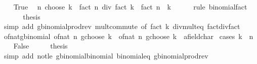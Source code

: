 \begin{isabellebody}
\ \ \isamarkupfalse%
\ True\ \isamarkupfalse%
\ {\isachardoublequoteopen}n\ choose\ k\ {\isacharequal}{\kern0pt}\ fact\ n\ div\ {\isacharparenleft}{\kern0pt}fact\ k\ {\isacharasterisk}{\kern0pt}\ fact\ {\isacharparenleft}{\kern0pt}n\ {\isacharminus}{\kern0pt}\ k{\isacharparenright}{\kern0pt}{\isacharparenright}{\kern0pt}{\isachardoublequoteclose}\isanewline
\ \ \ \ \isamarkupfalse%
\ {\isacharparenleft}{\kern0pt}rule\ binomial{\isacharunderscore}{\kern0pt}fact{\isacharprime}{\kern0pt}{\isacharparenright}{\kern0pt}\isanewline
\ \ \isamarkupfalse%
\ {\isacharasterisk}{\kern0pt}\ \isamarkupfalse%
\ {\isacharquery}{\kern0pt}thesis\isanewline
\ \ \ \ \isamarkupfalse%
\ {\isacharparenleft}{\kern0pt}simp\ add{\isacharcolon}{\kern0pt}\ gbinomial{\isacharunderscore}{\kern0pt}prod{\isacharunderscore}{\kern0pt}rev\ mult{\isachardot}{\kern0pt}commute\ {\isacharbrackleft}{\kern0pt}of\ {\isachardoublequoteopen}fact\ k{\isachardoublequoteclose}{\isacharbrackright}{\kern0pt}\ div{\isacharunderscore}{\kern0pt}mult{}{\isacharunderscore}{\kern0pt}eq\ fact{\isacharunderscore}{\kern0pt}div{\isacharunderscore}{\kern0pt}fact{\isacharparenright}{\kern0pt}\isanewline
{}\isamarkupfalse%
%
\endisatagproof
{\isafoldproof}%
%
\isadelimproof
\isanewline
%
\endisadelimproof
\isanewline
{}\isamarkupfalse%
\ of{\isacharunderscore}{\kern0pt}nat{\isacharunderscore}{\kern0pt}gbinomial{\isacharcolon}{\kern0pt}\ {\isachardoublequoteopen}of{\isacharunderscore}{\kern0pt}nat\ {\isacharparenleft}{\kern0pt}n\ gchoose\ k{\isacharparenright}{\kern0pt}\ {\isacharequal}{\kern0pt}\ {\isacharparenleft}{\kern0pt}of{\isacharunderscore}{\kern0pt}nat\ n\ gchoose\ k\ {\isacharcolon}{\kern0pt}{\isacharcolon}{\kern0pt}\ {\isacharprime}{\kern0pt}a{\isacharcolon}{\kern0pt}{\isacharcolon}{\kern0pt}field{\isacharunderscore}{\kern0pt}char{\isacharunderscore}{\kern0pt}{}{\isacharparenright}{\kern0pt}{\isachardoublequoteclose}\isanewline
%
\isadelimproof
%
\endisadelimproof
%
\isatagproof
{}\isamarkupfalse%
\ {\isacharparenleft}{\kern0pt}cases\ {\isachardoublequoteopen}k\ {\isasymle}\ n{\isachardoublequoteclose}{\isacharparenright}{\kern0pt}\isanewline
\ \ \isamarkupfalse%
\ False\isanewline
\ \ \isamarkupfalse%
\ \isamarkupfalse%
\ {\isacharquery}{\kern0pt}thesis\isanewline
\ \ \ \ \isamarkupfalse%
\ {\isacharparenleft}{\kern0pt}simp\ add{\isacharcolon}{\kern0pt}\ not{\isacharunderscore}{\kern0pt}le\ gbinomial{\isacharunderscore}{\kern0pt}binomial\ binomial{\isacharunderscore}{\kern0pt}eq{\isacharunderscore}{\kern0pt}{}\ gbinomial{\isacharunderscore}{\kern0pt}prod{\isacharunderscore}{\kern0pt}rev{\isacharparenright}{\kern0pt}\isanewline

\end{isabellebody}
